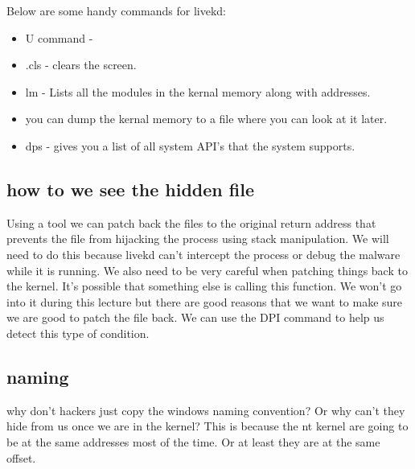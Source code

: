 \documentclass[letterpaper, onecolumn,10pt]{IEEEtran}
\begin{document}
		    Below are some handy commands for livekd:
		    \begin{itemize}
		        \item U command - 
		        \item .cls - clears the screen.\\
		        \item lm - Lists all the modules in the kernal memory along with addresses.\\
		        \item you can dump the kernal memory to a file where you can look at it later.\\
		        \item dps - gives you a list of all system API's that the system supports.\\
		    \end{itemize}
		    
		    \subsection{how to we see the hidden file}
		    Using a tool we can patch back the files to the original return address that prevents the file from hijacking the process using stack manipulation. We will need to do this because livekd can't intercept the process or debug the malware while it is running. We also need to be very careful when patching things back to the kernel. It's possible that something else is calling this function. We won't go into it during this lecture but there are good reasons that we want to make sure we are good to patch the file back. We can use the DPI command to help us detect this type of condition.\\
		   
		   \subsection{naming}
		    why don't hackers just copy the windows naming convention? Or why can't they hide from us once we are in the kernel? This is because the nt kernel are going to be at the same addresses most of the time. Or at least they are at the same offset.\\
		    
\end{document}
